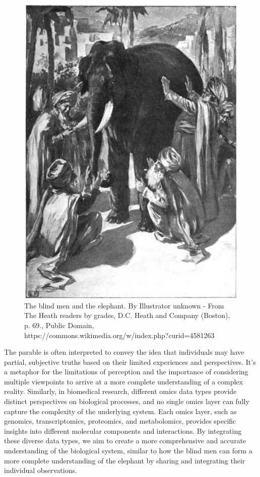 \documentclass[a4paper, nobind]{templates/ociamthesis}
\begin{document}
\begin{figure}

{\centering \includegraphics[width=0.95\linewidth]{figures/chapter1/1-1_blind_men} 

}

\caption[The blind men and the elephant]{The blind men and the elephant. By Illustrator unknown - From The Heath readers by grades, D.C. Heath and Company (Boston), p. 69., Public Domain, https://commons.wikimedia.org/w/index.php?curid=4581263}\label{fig:fig1-1}
\end{figure}

The parable is often interpreted to convey the idea that individuals may have partial, subjective truths based on their limited experiences and perspectives. It's a metaphor for the limitations of perception and the importance of considering multiple viewpoints to arrive at a more complete understanding of a complex reality. Similarly, in biomedical research, different omics data types provide distinct perspectives on biological processes, and no single omics layer can fully capture the complexity of the underlying system. Each omics layer, such as genomics, transcriptomics, proteomics, and metabolomics, provides specific insights into different molecular components and interactions. By integrating these diverse data types, we aim to create a more comprehensive and accurate understanding of the biological system, similar to how the blind men can form a more complete understanding of the elephant by sharing and integrating their individual observations.
\end{document}

